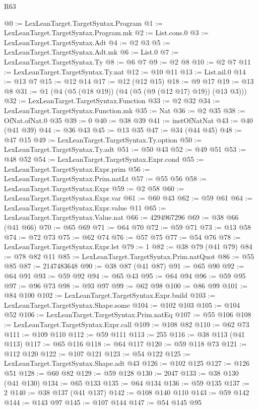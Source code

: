 \begin{lexlean}{R63}
\begin{coremodule}
@0 := LexLeanTarget.TargetSyntax.Program
@1 := LexLeanTarget.TargetSyntax.Program.mk
@2 := List.cons.{0}
@3 := LexLeanTarget.TargetSyntax.Adt
@4 := @2 @3
@5 := LexLeanTarget.TargetSyntax.Adt.mk
@6 := List.{0}
@7 := LexLeanTarget.TargetSyntax.Ty
@8 := @6 @7
@9 := @2 @8
@10 := @2 @7
@11 := LexLeanTarget.TargetSyntax.Ty.nat
@12 := @10 @11
@13 := List.nil.{0}
@14 := @13 @7
@15 := @12 @14
@17 := @12 (@12 @15)
@18 := @9 @17
@19 := @13 @8
@31 := @1 (@4 (@5 (@18 @19)) (@4 (@5 (@9 (@12 @17) @19)) (@13 @3)))
@32 := LexLeanTarget.TargetSyntax.Function
@33 := @2 @32
@34 := LexLeanTarget.TargetSyntax.Function.mk
@35 := Nat
@36 := @2 @35
@38 := OfNat.ofNat.{0} @35
@39 := 0
@40 := @38 @39
@41 := instOfNatNat
@43 := @40 (@41 @39)
@44 := @36 @43
@45 := @13 @35
@47 := @34 (@44 @45)
@48 := @47 @15
@49 := LexLeanTarget.TargetSyntax.Ty.option
@50 := LexLeanTarget.TargetSyntax.Ty.adt
@51 := @50 @43
@52 := @49 @51
@53 := @48 @52
@54 := LexLeanTarget.TargetSyntax.Expr.cond
@55 := LexLeanTarget.TargetSyntax.Expr.prim
@56 := LexLeanTarget.TargetSyntax.Prim.natLt
@57 := @55 @56
@58 := LexLeanTarget.TargetSyntax.Expr
@59 := @2 @58
@60 := LexLeanTarget.TargetSyntax.Expr.var
@61 := @60 @43
@62 := @59 @61
@64 := LexLeanTarget.TargetSyntax.Expr.value @11
@65 := LexLeanTarget.TargetSyntax.Value.nat
@66 := 4294967296
@69 := @38 @66 (@41 @66)
@70 := @65 @69
@71 := @64 @70
@72 := @59 @71
@73 := @13 @58
@74 := @72 @73
@75 := @62 @74
@76 := @57 @75
@77 := @54 @76
@78 := LexLeanTarget.TargetSyntax.Expr.let
@79 := 1
@82 := @38 @79 (@41 @79)
@84 := @78 @82 @11
@85 := LexLeanTarget.TargetSyntax.Prim.natQuot
@86 := @55 @85
@87 := 2147483648
@90 := @38 @87 (@41 @87)
@91 := @65 @90
@92 := @64 @91
@93 := @59 @92
@94 := @65 @43
@95 := @64 @94
@96 := @59 @95
@97 := @96 @73
@98 := @93 @97
@99 := @62 @98
@100 := @86 @99
@101 := @84 @100
@102 := LexLeanTarget.TargetSyntax.Expr.build
@103 := LexLeanTarget.TargetSyntax.Shape.some
@104 := @102 @103
@105 := @104 @52
@106 := LexLeanTarget.TargetSyntax.Prim.natEq
@107 := @55 @106
@108 := LexLeanTarget.TargetSyntax.Expr.call
@109 := @108 @82
@110 := @62 @73
@111 := @109 @110
@112 := @59 @111
@113 := 255
@116 := @38 @113 (@41 @113)
@117 := @65 @116
@118 := @64 @117
@120 := @59 @118 @73
@121 := @112 @120
@122 := @107 @121
@123 := @54 @122
@125 := LexLeanTarget.TargetSyntax.Shape.adt @43
@126 := @102 @125
@127 := @126 @51
@128 := @60 @82
@129 := @59 @128
@130 := 2047
@133 := @38 @130 (@41 @130)
@134 := @65 @133
@135 := @64 @134
@136 := @59 @135
@137 := 2
@140 := @38 @137 (@41 @137)
@142 := @108 @140 @110
@143 := @59 @142
@144 := @143 @97
@145 := @107 @144
@147 := @54 @145 @95

\end{coremodule}
\end{lexlean}
